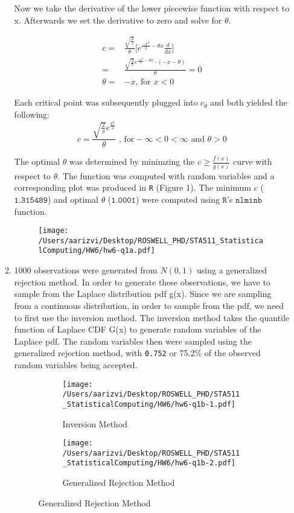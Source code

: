 \documentclass[letterpaper]{article}
\begin{document}
\begin{enumerate}
\begin{enumerate}
Now we take the derivative of the lower piecewise function with respect to x. Afterwards we set the derivative to zero and solve for $\theta$.


\begin{align*}
c =& \frac{\sqrt{\frac{2}{\pi}}}{\theta} \Bigg[ e^{\frac{-x^{2}}{2} - \theta x} \frac{d}{dx}\Bigg] \\
   = & \frac{\sqrt{\frac{2}{\pi}}e^{\frac{-x^{2}}{2} - \theta x} \cdot (-x - \theta)}{\theta} = 0 \\
  \theta =& -x \text{, for } x < 0
\end{align*}

Each critical point was subsequently plugged into $c_{\theta}$ and both yielded the following:
$$ c = \frac{\sqrt{\frac{2}{\pi}}e^{\frac{\theta^{2}}{2}}}{\theta} \text{ , for} -\infty < 0 < \infty \text{ and } \theta > 0$$

The optimal $\theta$ was determined by minimzing the $c \geq \frac{f(x)}{g(x)}$ curve with respect to $\theta$. The function was computed with random variables and a corresponding plot was produced in \texttt{R} (Figure 1). The minimum $c$ ($\texttt{1.315489}$) and  optimal $\theta$ ($\texttt{1.0001}$) were computed using $\texttt{R}$'s $\texttt{nlminb}$ function. 

\begin{figure}[t]
\centering
\caption{}
\texttt{[image: /Users/aarizvi/Desktop/ROSWELL\_PHD/STA511\_StatisticalComputing/HW6/hw6-q1a.pdf]}
\end{figure}

\item 1000 observations were generated from $N(0,1)$ using a generalized rejection method. In order to generate these observations, we have to sample from the Laplace distribution pdf g(x). Since we are sampling from a continuous distribution, in order to sample from the pdf, we need to first use the inversion method. The inversion method takes the quantile function of Laplace CDF G(x) to generate random variables of the Laplace pdf. The random variables then were sampled using the generalized rejection method, with \texttt{0.752} or 75.2\% of the observed random variables being accepted.

\begin{figure}
    \centering
    \caption{}
    \begin{subfigure}{0.4\textwidth}
        \centering
        \texttt{[image: /Users/aarizvi/Desktop/ROSWELL\_PHD/STA511\_StatisticalComputing/HW6/hw6-q1b-1.pdf]}
        \caption{Inversion Method}
    \end{subfigure}
    \begin{subfigure}{0.4\textwidth}
        \centering
        \texttt{[image: /Users/aarizvi/Desktop/ROSWELL\_PHD/STA511\_StatisticalComputing/HW6/hw6-q1b-2.pdf]} 
        \caption{Generalized Rejection Method}
    \end{subfigure}
\end{figure}


\end{enumerate}
\end{enumerate}
\end{document}
